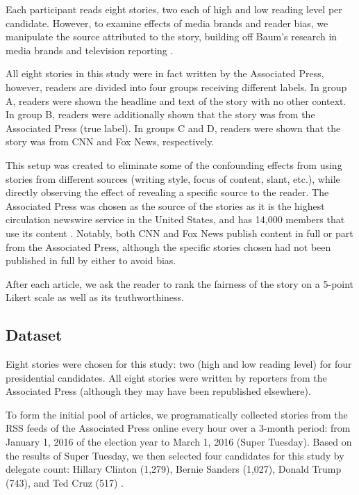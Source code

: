 Each participant reads eight stories, two each of high and low reading level per candidate. However, to examine effects of media brands and reader bias, we manipulate the source attributed to the story, building off Baum's research in media brands and television reporting \cite{baum2008eye}.

All eight stories in this study were in fact written by the Associated Press, however, readers are divided into four groups receiving different labels. In group A, readers were shown the headline and text of the story with no other context. In group B, readers were additionally shown that the story was from the Associated Press (true label). In groups C and D, readers were shown that the story was from CNN and Fox News, respectively.

This setup was created to eliminate some of the confounding effects from using stories from different sources (writing style, focus of content, slant, etc.), while directly observing the effect of revealing a specific source to the reader. The Associated Press was chosen as the source of the stories as it is the highest circulation newswire service in the United States, and has 14,000 members that use its content \cite{apFAQ}. Notably, both CNN and Fox News publish content in full or part from the Associated Press, although the specific stories chosen had not been published in full by either to avoid bias.

After each article, we ask the reader to rank the fairness of the story on a 5-point Likert scale as well as its truthworthiness.

\subsection{Dataset} 

Eight stories were chosen for this study: two (high and low reading level) for four presidential candidates. All eight stories were written by reporters from the Associated Press (although they may have been republished elsewhere).

To form the initial pool of articles, we programatically collected stories from the RSS feeds of the Associated Press online every hour over a 3-month period: from January 1, 2016 of the election year to March 1, 2016 (Super Tuesday). 
Based on the results of Super Tuesday, we then selected four candidates for this study by delegate count: Hillary Clinton (1,279), Bernie Sanders (1,027), Donald Trump (743), and Ted Cruz (517) \cite{March45online}.

